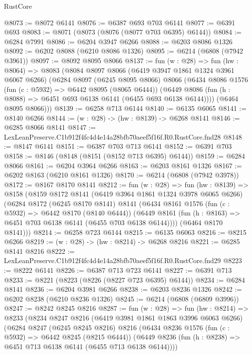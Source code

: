 \begin{lexlean}{RustCore}
\begin{coremodule}
@8073 := @8072 @6141
@8076 := @6387 @693 @703 @6141
@8077 := @6391 @693
@8083 := @8071 (@8073 (@8076 (@8077 @703 @6395) @6144))
@8084 := @6284 @7991
@8086 := @6204 @3947 @6266
@8088 := @6203 @8086 @1326
@8092 := @6202 @8088 (@6210 @8086 @1326)
@8095 := @6214 (@6808 (@7942 @3961))
@8097 := @8092 @8095 @8066
@8137 := fun (w : @28) =>
  fun (hw : @8064) =>
  @8083
    (@8084
      @8097
      @8066
      (@6419 @3947 @1861 @1324 @3961 @6067 @6266)
      (@6284
        @8097
        (@6245 @8095 @8066)
        @8066
        (@6434
          @8086
          @1576
          (fun (c : @5932) => @6442 @8095 (@8065 @6444))
          (@6449 @8086 (fun (h : @8088) => @6451 @693 @6138 @6141 (@6455 @693 @6138 @6144))))
        (@6464 @8095 @8066)))
@8139 := @6258 @713 @6144
@8140 := @6135 @6065
@8141 := @8140 @6266
@8144 := (w : @28) -> (hw : @8139) -> @6268 @8141
@8146 := @6285 @8066 @8141
@8147 := LexLeanPreserve.C1b912f4fc4d4e14a28bfb70aeef5f16f.R0.RustCore.fnd28
@8148 := @8147 @6141
@8151 := @6387 @703 @713 @6141
@8152 := @6391 @703
@8158 := @8146 (@8148 (@8151 (@8152 @713 @6395) @6144))
@8159 := @6284 @8066
@8161 := @6204 @3964 @6266
@8163 := @6203 @8161 @1326
@8167 := @6202 @8163 (@6210 @8161 @1326)
@8170 := @6214 (@6808 (@7942 @3978))
@8172 := @8167 @8170 @8141
@8212 := fun (w : @28) =>
  fun (hw : @8139) =>
  @8158
    (@8159
      @8172
      @8141
      (@6419 @3964 @1861 @1324 @3978 @6065 @6266)
      (@6284
        @8172
        (@6245 @8170 @8141)
        @8141
        (@6434
          @8161
          @1576
          (fun (c : @5932) => @6442 @8170 (@8140 @6444))
          (@6449 @8161 (fun (h : @8163) => @6451 @703 @6138 @6141 (@6455 @703 @6138 @6144))))
        (@6464 @8170 @8141)))
@8214 := @6258 @723 @6144
@8215 := @6135 @6063
@8216 := @8215 @6266
@8219 := (w : @28) -> (hw : @8214) -> @6268 @8216
@8221 := @6285 @8141 @8216
@8222 := LexLeanPreserve.C1b912f4fc4d4e14a28bfb70aeef5f16f.R0.RustCore.fnd29
@8223 := @8222 @6141
@8226 := @6387 @713 @723 @6141
@8227 := @6391 @713
@8233 := @8221 (@8223 (@8226 (@8227 @723 @6395) @6144))
@8234 := @6284 @8141
@8236 := @6204 @3981 @6266
@8238 := @6203 @8236 @1326
@8242 := @6202 @8238 (@6210 @8236 @1326)
@8245 := @6214 (@6808 (@6809 @3996))
@8247 := @8242 @8245 @8216
@8287 := fun (w : @28) =>
  fun (hw : @8214) =>
  @8233
    (@8234
      @8247
      @8216
      (@6419 @3981 @1861 @1863 @3996 @6063 @6266)
      (@6284
        @8247
        (@6245 @8245 @8216)
        @8216
        (@6434
          @8236
          @1576
          (fun (c : @5932) => @6442 @8245 (@8215 @6444))
          (@6449 @8236 (fun (h : @8238) => @6451 @713 @6138 @6141 (@6455 @713 @6138 @6144))))

\end{coremodule}
\end{lexlean}
